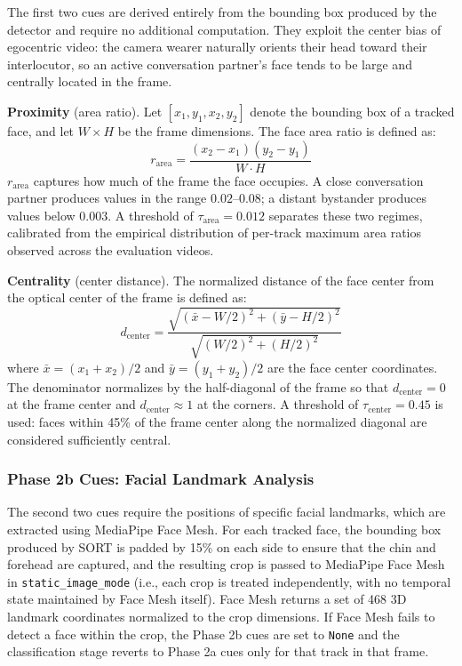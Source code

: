The first two cues are derived entirely from the bounding box produced by the detector
and require no additional computation. They exploit the center bias of egocentric video:
the camera wearer naturally orients their head toward their interlocutor, so an active
conversation partner's face tends to be large and centrally located in the frame.

\textbf{Proximity} (area ratio). Let $[x_1, y_1, x_2, y_2]$ denote the bounding box of
a tracked face, and let $W \times H$ be the frame dimensions. The face area ratio is
defined as:
\begin{equation}
  r_{\mathrm{area}} = \frac{(x_2 - x_1)(y_2 - y_1)}{W \cdot H}
  \label{eq:area_ratio}
\end{equation}
$r_{\mathrm{area}}$ captures how much of the frame the face occupies. A close conversation
partner produces values in the range $0.02$--$0.08$; a distant bystander produces
values below $0.003$. A threshold of $\tau_{\mathrm{area}} = 0.012$ separates these two
regimes, calibrated from the empirical distribution of per-track maximum area ratios
observed across the evaluation videos.

\textbf{Centrality} (center distance). The normalized distance of the face center from
the optical center of the frame is defined as:
\begin{equation}
  d_{\mathrm{center}} = \frac{\sqrt{(\bar{x} - W/2)^2 + (\bar{y} - H/2)^2}}
                             {\sqrt{(W/2)^2 + (H/2)^2}}
  \label{eq:center_dist}
\end{equation}
where $\bar{x} = (x_1 + x_2)/2$ and $\bar{y} = (y_1 + y_2)/2$ are the face center
coordinates. The denominator normalizes by the half-diagonal of the frame so that
$d_{\mathrm{center}} = 0$ at the frame center and $d_{\mathrm{center}} \approx 1$ at the
corners. A threshold of $\tau_{\mathrm{center}} = 0.45$ is used: faces within 45\% of
the frame center along the normalized diagonal are considered sufficiently central.

\subsubsection*{Phase 2b Cues: Facial Landmark Analysis}

The second two cues require the positions of specific facial landmarks, which are
extracted using MediaPipe Face Mesh. For each tracked face, the bounding box produced
by SORT is padded by 15\% on each side to ensure that the chin and forehead are
captured, and the resulting crop is passed to MediaPipe Face Mesh in
\texttt{static\_image\_mode} (i.e., each crop is treated independently, with no temporal
state maintained by Face Mesh itself). Face Mesh returns a set of 468 3D landmark
coordinates normalized to the crop dimensions. If Face Mesh fails to detect a face
within the crop, the Phase 2b cues are set to \texttt{None} and the classification
stage reverts to Phase 2a cues only for that track in that frame.

